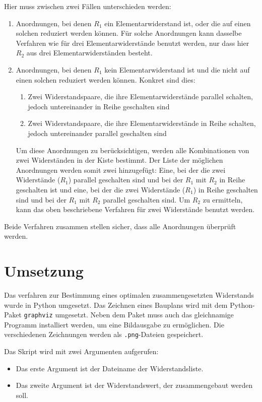 \documentclass[a4paper,10pt,ngerman]{scrartcl}
\begin{document}
\begin{enumerate}
  Hier muss zwischen zwei Fällen unterschieden werden:
  \begin{enumerate}
    \item Anordnungen, bei denen $R_1$ ein Elementarwiderstand ist, oder die auf einen solchen reduziert werden können. Für solche Anordnungen kann dasselbe Verfahren wie für drei Elementarwiderstände benutzt werden, nur dass hier $R_2$ aus drei Elementarwiderständen besteht.
    \item Anordnungen, bei denen $R_1$ kein Elementarwiderstand ist und die nicht auf einen solchen reduziert werden können. Konkret sind dies:
    \begin{enumerate}
      \item Zwei Widerstandspaare, die ihre Elementarwiderstände parallel schalten, jedoch untereinander in Reihe geschalten sind
      \item Zwei Widerstandspaare, die ihre Elementarwiderstände in Reihe schalten, jedoch untereinander parallel geschalten sind
    \end{enumerate}
    Um diese Anordnungen zu berücksichtigen, werden alle Kombinationen von zwei Widerständen in der Kiste bestimmt. Der Liste der möglichen Anordnungen werden somit zwei hinzugefügt: Eine, bei der die zwei Widerstände ($R_1$) parallel geschalten sind und bei der $R_1$ mit $R_2$ in Reihe geschalten ist und eine, bei der die zwei Widerstände ($R_1$) in Reihe geschalten sind und bei der $R_1$ mit $R_2$ parallel geschalten sind. Um $R_2$ zu ermitteln, kann das oben beschriebene Verfahren für zwei Widerstände benutzt werden.
  \end{enumerate}
  Beide Verfahren zusammen stellen sicher, dass alle Anordnungen überprüft werden.
\end{enumerate}


\section{Umsetzung}
Das verfahren zur Bestimmung eines optimalen zusammengesetzten Widerstands wurde in Python umgesetzt. Das Zeichnen eines Bauplans wird mit dem Python-Paket \texttt{graphviz} umgesetzt. Neben dem Paket muss auch das gleichnamige Programm installiert werden, um eine Bildausgabe zu ermöglichen. Die verschiedenen Zeichnungen werden als \texttt{.png}-Dateien gespeichert.

Das Skript wird mit zwei Argumenten aufgerufen:
\begin{itemize}
  \item Das erste Argument ist der Dateiname der Widerstandsliste.
  \item Das zweite Argument ist der Widerstandswert, der zusammengebaut werden soll.
\end{itemize}
\end{document}
